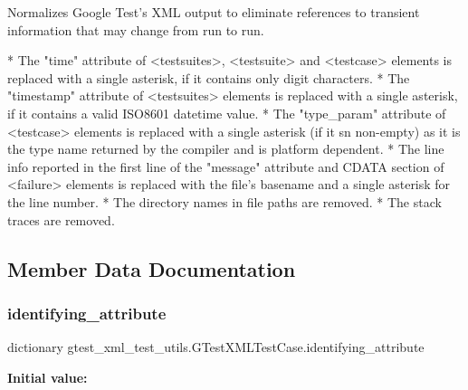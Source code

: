 \begin{DoxyVerb}Normalizes Google Test's XML output to eliminate references to transient
information that may change from run to run.

*  The "time" attribute of <testsuites>, <testsuite> and <testcase>
   elements is replaced with a single asterisk, if it contains
   only digit characters.
*  The "timestamp" attribute of <testsuites> elements is replaced with a
   single asterisk, if it contains a valid ISO8601 datetime value.
*  The "type_param" attribute of <testcase> elements is replaced with a
   single asterisk (if it sn non-empty) as it is the type name returned
   by the compiler and is platform dependent.
*  The line info reported in the first line of the "message"
   attribute and CDATA section of <failure> elements is replaced with the
   file's basename and a single asterisk for the line number.
*  The directory names in file paths are removed.
*  The stack traces are removed.
\end{DoxyVerb}
 

\subsection{Member Data Documentation}
\mbox{\label{classgtest__xml__test__utils_1_1_g_test_x_m_l_test_case_a0e3a4e84e18f29d2248dcd670a0a6ae6}} 
\subsubsection{\texorpdfstring{identifying\_attribute}{identifying\_attribute}}
{\footnotesize\ttfamily dictionary gtest\+\_\+xml\+\_\+test\+\_\+utils.\+G\+Test\+X\+M\+L\+Test\+Case.\+identifying\+\_\+attribute\hspace{0.3cm}{\ttfamily [static]}}

{\bfseries Initial value\+:}
\begin{DoxyCode}{0}
\DoxyCodeLine{=  \{}
\DoxyCodeLine{      \textcolor{stringliteral}{'testsuites'}: \textcolor{stringliteral}{'name'},}
\DoxyCodeLine{      \textcolor{stringliteral}{'testsuite'}: \textcolor{stringliteral}{'name'},}
\DoxyCodeLine{      \textcolor{stringliteral}{'testcase'}: \textcolor{stringliteral}{'name'},}
\DoxyCodeLine{      \textcolor{stringliteral}{'failure'}: \textcolor{stringliteral}{'message'},}
\DoxyCodeLine{      \textcolor{stringliteral}{'property'}: \textcolor{stringliteral}{'name'},}
\DoxyCodeLine{  \}}

\end{DoxyCode}


